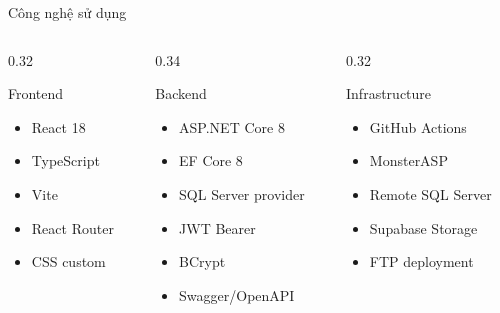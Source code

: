 \documentclass[aspectratio=169,11pt]{beamer}
\begin{document}
\begin{frame}{Công nghệ sử dụng}
  \begin{columns}[T]
    \begin{column}{0.32\textwidth}
      \begin{block}{Frontend}
        \begin{itemize}
          \item React 18
          \item TypeScript
          \item Vite
          \item React Router
          \item CSS custom
        \end{itemize}
      \end{block}
    \end{column}
    \begin{column}{0.34\textwidth}
      \begin{block}{Backend}
        \begin{itemize}
          \item ASP.NET Core 8
          \item EF Core 8
          \item SQL Server provider
          \item JWT Bearer
          \item BCrypt
          \item Swagger/OpenAPI
        \end{itemize}
      \end{block}
    \end{column}
    \begin{column}{0.32\textwidth}
      \begin{block}{Infrastructure}
        \begin{itemize}
          \item GitHub Actions
          \item MonsterASP
          \item Remote SQL Server
          \item Supabase Storage
          \item FTP deployment
        \end{itemize}
      \end{block}
    \end{column}
  \end{columns}
\end{frame}
\end{document}
